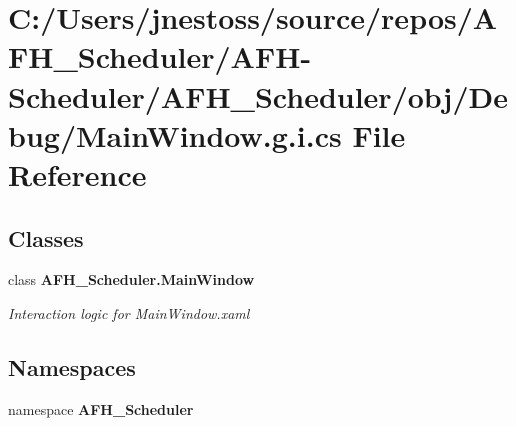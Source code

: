 \section{C\+:/\+Users/jnestoss/source/repos/\+A\+F\+H\+\_\+\+Scheduler/\+A\+F\+H-\/\+Scheduler/\+A\+F\+H\+\_\+\+Scheduler/obj/\+Debug/\+Main\+Window.g.\+i.\+cs File Reference}
\label{_debug_2_main_window_8g_8i_8cs}
\subsection*{Classes}
\begin{DoxyCompactItemize}
\item 
class \textbf{ A\+F\+H\+\_\+\+Scheduler.\+Main\+Window}
\begin{DoxyCompactList}\small\item\em Interaction logic for Main\+Window.\+xaml \end{DoxyCompactList}\end{DoxyCompactItemize}
\subsection*{Namespaces}
\begin{DoxyCompactItemize}
\item 
namespace \textbf{ A\+F\+H\+\_\+\+Scheduler}
\end{DoxyCompactItemize}
